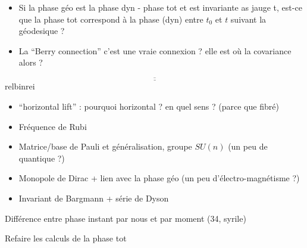 \begin{itemize}
	\item Si la phase géo est la phase dyn - phase tot et est invariante as jauge t, est-ce que la phase tot correspond à la phase (dyn) entre $t_0$ et $t$ suivant la géodesique ?
	
	\item La ``Berry connection'' c'est une vraie connexion ? elle est où la covariance alors ?
\end{itemize}

\[\underline{\overline{\qquad\qquad\qquad\qquad\qquad\qquad\qquad\qquad\qquad\qquad\qquad\qquad\qquad\qquad\qquad\qquad\qquad\qquad}}\]{\color{white}relbinrei}

\begin{itemize}
	\item ``horizontal lift'' : pourquoi horizontal ? en quel sens ? (parce que fibré)
	
	\item Fréquence de Rubi
	
	\item Matrice/base de Pauli et généralisation, groupe $SU(n)$ (un peu de quantique ?)
	
	\item Monopole de Dirac + lien avec la phase géo (un peu d'électro-magnétisme ?)
	
	\item Invariant de Bargmann + série de Dyson
\end{itemize}


Différence entre phase instant par nous et par moment (34, syrile)

Refaire les calculs de la phase tot



\newpage

\listoffigures
\vfill
\lstlistoflistings
\vfill

\newpage

{}

